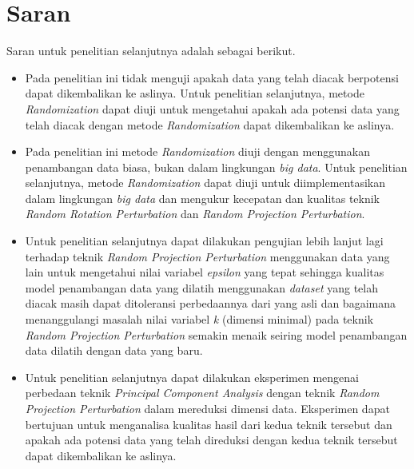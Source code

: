 \section{Saran}
\label{sec:saran}

Saran untuk penelitian selanjutnya adalah sebagai berikut.
\begin{itemize}
    \item Pada penelitian ini tidak menguji apakah data yang telah diacak berpotensi dapat dikembalikan ke aslinya. Untuk penelitian selanjutnya, metode \textit{Randomization} dapat diuji untuk mengetahui apakah ada potensi data yang telah diacak dengan metode \textit{Randomization} dapat dikembalikan ke aslinya.
    \item Pada penelitian ini metode \textit{Randomization} diuji dengan menggunakan penambangan data biasa, bukan dalam lingkungan \textit{big data}. Untuk penelitian selanjutnya, metode \textit{Randomization} dapat diuji untuk diimplementasikan dalam lingkungan \textit{big data} dan mengukur kecepatan dan kualitas teknik \textit{Random Rotation Perturbation} dan \textit{Random Projection Perturbation}.
    \item Untuk penelitian selanjutnya dapat dilakukan pengujian lebih lanjut lagi terhadap teknik \textit{Random Projection Perturbation} menggunakan data yang lain untuk mengetahui nilai variabel \textit{epsilon} yang tepat sehingga kualitas model penambangan data yang dilatih menggunakan \textit{dataset} yang telah diacak masih dapat ditoleransi perbedaannya dari yang asli dan bagaimana menanggulangi masalah nilai variabel \textit{k} (dimensi minimal) pada teknik \textit{Random Projection Perturbation} semakin menaik seiring model penambangan data dilatih dengan data yang baru.
    \item Untuk penelitian selanjutnya dapat dilakukan eksperimen mengenai perbedaan teknik \textit{Principal Component Analysis} dengan teknik \textit{Random Projection Perturbation} dalam mereduksi dimensi data. Eksperimen dapat bertujuan untuk menganalisa kualitas hasil dari kedua teknik tersebut dan apakah ada potensi data yang telah direduksi dengan kedua teknik tersebut dapat dikembalikan ke aslinya.
\end{itemize}
